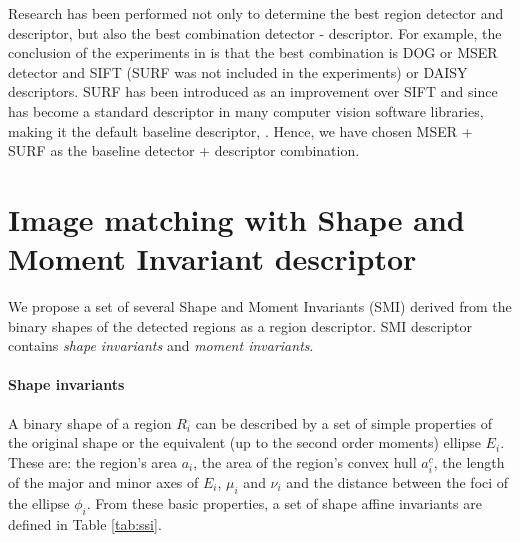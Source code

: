 \documentclass[a4paper,11pt]{article}
\begin{document}
Research has been performed not only to determine the best region detector and descriptor, but also the best combination detector - descriptor.
For example, the conclusion of the experiments in \cite{DahlAP11} is that the best combination is DOG or MSER detector and SIFT (SURF was not included in the experiments) or DAISY descriptors. SURF has been introduced as an improvement over SIFT and since has become a standard descriptor in many computer vision software libraries, making it the default baseline descriptor, \cite{Bay2008}.
Hence, we have chosen MSER + SURF as the baseline detector + descriptor combination.

\section{Image matching with Shape and Moment Invariant descriptor}\label{sec:match}
We propose a set of several Shape and Moment Invariants (SMI) derived from the binary shapes of the detected regions as a region descriptor. SMI descriptor contains {\em shape invariants} and {\em moment invariants}.

\paragraph{Shape invariants}
A binary shape of a region $R_i$ can be described by a set of simple properties of the original shape or the equivalent (up to the second order moments) ellipse $E_i$. These are: the region's area $a_i$, the area of the region's convex hull $a^c_i$, the length of the major and minor axes of $E_i$, $\mu_i$ and $\nu_i$ and the distance between the foci of the ellipse $\phi_i$. From these basic properties, a set of shape affine invariants are defined in Table \ref{tab:ssi}.   
\end{document}
